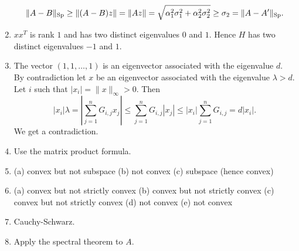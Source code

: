 \documentclass[11pt,nocut]{article}
\begin{document}
\begin{enumerate}
	$$
	\|A-B\|_{\rm Sp} \geq \|(A-B)z\| = \|Az\| = \sqrt{\alpha_1^2 \sigma_1^2 + \alpha_2^2 \sigma_2^2} \geq \sigma_2 =  \|A-A'\|_{\rm Sp}.
	$$
\item $xx^T$ is rank $1$ and has two distinct eigenvalues $0$ and $1$. Hence $H$ has two distinct eigenvalues $-1$ and $1$.
\item The vector $(1,1, \dots,1)$ is an eigenvector associated with the eigenvalue $d$. By contradiction let $x$ be an eigenvector associated with the eigenvalue $\lambda >d$. Let $i$ such that $|x_i| = \|x\|_{\infty} >0$. Then
	$$
	|x_i| \lambda 
	= |\sum_{j=1}^n G_{i,j} x_j|
	\leq \sum_{j=1}^n G_{i,j} |x_j|
	\leq |x_i| \sum_{j=1}^n G_{i,j} = d |x_i|.
	$$
	We get a contradiction.
\item Use the matrix product formula.
\item (a) convex but not subspace (b) not convex (c) subspace (hence convex)
\item (a) convex but not strictly convex (b) convex but not strictly convex (c) convex but not strictly convex (d) not convex (e) not convex
\item Cauchy-Schwarz.
\item Apply the spectral theorem to $A$.
\end{enumerate}


\vspace{1cm}
\centerline{}

%
%
\end{document}
